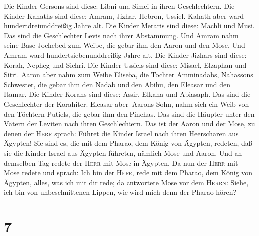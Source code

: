Die Kinder Gersons sind diese: Libni und Simei in ihren Geschlechtern.
 Die Kinder Kahaths sind diese: Amram, Jizhar, Hebron,
Ussiel. Kahath aber ward hundertdreiunddreißig Jahre alt.
 Die Kinder Meraris sind diese: Machli und Musi. Das sind
die Geschlechter Levis nach ihrer Abstammung.  Und Amram
nahm seine Base Jochebed zum Weibe, die gebar ihm den Aaron und den
Mose. Und Amram ward hundertsiebenunddreißig Jahre alt. 
Die Kinder Jizhars sind diese: Korah, Nepheg und Sichri. 
Die Kinder Ussiels sind diese: Misael, Elzaphan und Sitri.
 Aaron aber nahm zum Weibe Eliseba, die Tochter
Amminadabs, Nahassons Schwester, die gebar ihm den Nadab und den Abihu,
den Eleasar und den Itamar.  Die Kinder Korahs sind
diese: Assir, Elkana und Abiasaph. Das sind die Geschlechter der
Korahiter.  Eleasar aber, Aarons Sohn, nahm sich ein Weib
von den Töchtern Putiels, die gebar ihm den Pinehas. Das sind die
Häupter unter den Vätern der Leviten nach ihren Geschlechtern.
 Das ist der Aaron und der Mose, zu denen der
\textsc{Herr} sprach: Führet die Kinder Israel nach ihren Heerscharen
aus Ägypten!  Sie sind es, die mit dem Pharao, dem König
von Ägypten, redeten, daß sie die Kinder Israel aus Ägypten führeten,
nämlich Mose und Aaron.  Und an demselben Tag redete der
\textsc{Herr} mit Mose in Ägypten.  Da nun der
\textsc{Herr} mit Mose redete und sprach: Ich bin der \textsc{Herr},
rede mit dem Pharao, dem König von Ägypten, alles, was ich mit dir rede;
 da antwortete Mose vor dem \textsc{Herrn}: Siehe, ich
bin von unbeschnittenen Lippen, wie wird mich denn der Pharao hören?

\hypertarget{section-6}{%
\section{7}\label{section-6}}

